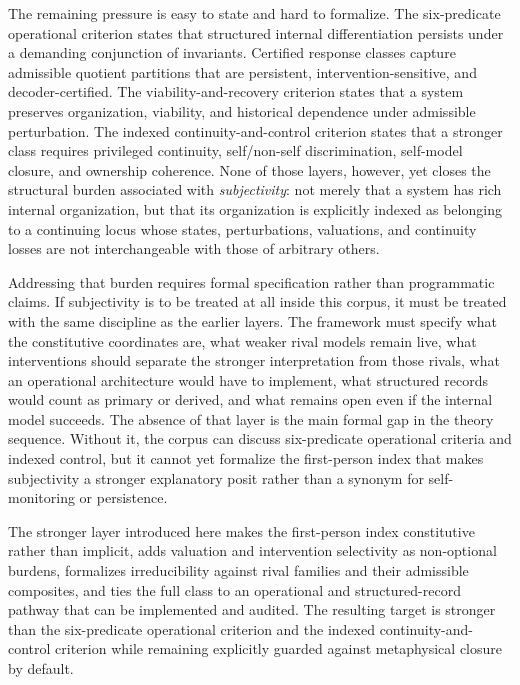 \documentclass[11pt,a4paper]{article}
\theoremstyle{definition}
\begin{document}
The remaining pressure is easy to state and hard to formalize. The six-predicate operational criterion states that structured internal differentiation persists under a demanding conjunction of invariants. Certified response classes capture admissible quotient partitions that are persistent, intervention-sensitive, and decoder-certified. The viability-and-recovery criterion states that a system preserves organization, viability, and historical dependence under admissible perturbation. The indexed continuity-and-control criterion states that a stronger class requires privileged continuity, self/non-self discrimination, self-model closure, and ownership coherence. None of those layers, however, yet closes the structural burden associated with \emph{subjectivity}: not merely that a system has rich internal organization, but that its organization is explicitly indexed as belonging to a continuing locus whose states, perturbations, valuations, and continuity losses are not interchangeable with those of arbitrary others.

Addressing that burden requires formal specification rather than programmatic claims. If subjectivity is to be treated at all inside this corpus, it must be treated with the same discipline as the earlier layers. The framework must specify what the constitutive coordinates are, what weaker rival models remain live, what interventions should separate the stronger interpretation from those rivals, what an operational architecture would have to implement, what structured records would count as primary or derived, and what remains open even if the internal model succeeds. The absence of that layer is the main formal gap in the theory sequence. Without it, the corpus can discuss six-predicate operational criteria and indexed control, but it cannot yet formalize the first-person index that makes subjectivity a stronger explanatory posit rather than a synonym for self-monitoring or persistence.

The stronger layer introduced here makes the first-person index constitutive rather than implicit, adds valuation and intervention selectivity as non-optional burdens, formalizes irreducibility against rival families and their admissible composites, and ties the full class to an operational and structured-record pathway that can be implemented and audited. The resulting target is stronger than the six-predicate operational criterion and the indexed continuity-and-control criterion while remaining explicitly guarded against metaphysical closure by default.
\end{document}
